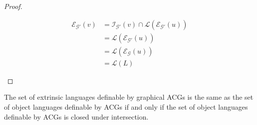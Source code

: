 \begin{proof}
\begin{itemize}
    \begin{align*}
      \mathcal{E}_{\mathcal{G}'}(v) &= \mathcal{I}_{\mathcal{G}'}(v) \cap
      \mathcal{L}(\mathcal{E}_{\mathcal{G}'}(u)) \\
      &= \mathcal{L}(\mathcal{E}_{\mathcal{G}'}(u)) \\
      &= \mathcal{L}(\mathcal{E}_{\mathcal{G}}(u)) \\
      &= \mathcal{L}(L)
    \end{align*}
  \end{itemize}
\end{proof}

\begin{corollary}
  The set of extrinsic languages definable by graphical ACGs is the same
  as the set of object languages definable by ACGs if and only if the
  set of object languages definable by ACGs is closed under
  intersection.
\end{corollary}
